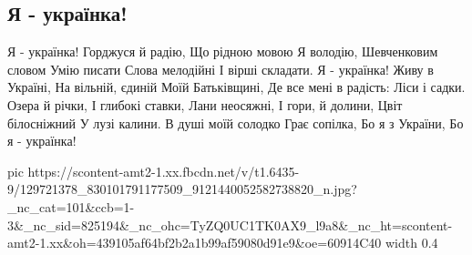 
 
 
 
 

\subsection{Я - українка!}
\label{sec:04_12_2020.fb.pasternak_maria.1.ukrainka_stih}

Я - українка!
Горджуся й радію,
Що рідною мовою
Я володію,
Шевченковим словом
Умію писати
Слова мелодійні
І вірші складати.
Я - українка!
Живу в Україні,
На вільній, єдиній
Моїй Батьківщині,
Де все мені в радість:
Ліси і садки.
Озера й річки,
І глибокі ставки,
Лани неосяжні,
І гори, й долини,
Цвіт білосніжний
У лузі калини.
В душі моїй солодко
Грає сопілка,
Бо я з України,
Бо я - українка!


\ifcmt
  pic https://scontent-amt2-1.xx.fbcdn.net/v/t1.6435-9/129721378_830101791177509_9121440052582738820_n.jpg?_nc_cat=101&ccb=1-3&_nc_sid=825194&_nc_ohc=TyZQ0UC1TK0AX9_l9a8&_nc_ht=scontent-amt2-1.xx&oh=439105af64bf2b2a1b99af59080d91e9&oe=60914C40
  width 0.4
\fi

